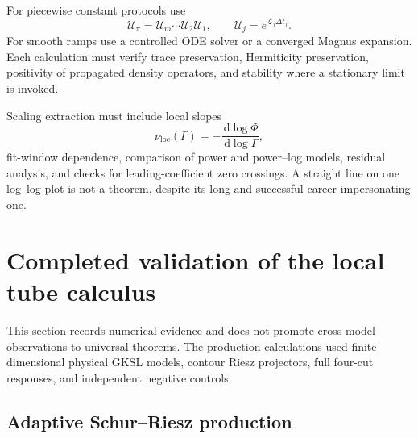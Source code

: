\documentclass[11pt]{article}
\theoremstyle{definition}
\theoremstyle{remark}
\newcommand{\dd}{\,\mathrm d}
\newcommand{\cL}{\mathcal L}
\newcommand{\cU}{\mathcal U}
\newcommand{\PhiF}{\Phi}
\begin{document}
For piecewise constant protocols use
\begin{equation}
\cU_{\pi}=\cU_m\cdots\cU_2\cU_1,
\qquad
\cU_j=e^{\cL_j\Delta t_j}.
\end{equation}
For smooth ramps use a controlled ODE solver or a converged Magnus expansion. Each calculation must verify trace preservation, Hermiticity preservation, positivity of propagated density operators, and stability where a stationary limit is invoked.

Scaling extraction must include local slopes
\begin{equation}
\nu_{\mathrm{loc}}(\Gamma)
 = -\frac{\dd\log\PhiF}{\dd\log\Gamma},
\end{equation}
fit-window dependence, comparison of power and power--log models, residual analysis, and checks for leading-coefficient zero crossings. A straight line on one log--log plot is not a theorem, despite its long and successful career impersonating one.

\section{Completed validation of the local tube calculus}\label{sec:tube-validation}

This section records numerical evidence and does not promote cross-model observations to universal theorems. The production calculations used finite-dimensional physical GKSL models, contour Riesz projectors, full four-cut responses, and independent negative controls.

\subsection{Adaptive Schur--Riesz production}
\end{document}
